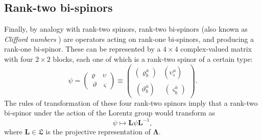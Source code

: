 \documentclass[12pt]{article}
\theoremstyle{definition}
\numberwithin{equation}{section}
\newcommand{\bL}{\mathbf{L}}
\newcommand{\beq}{\begin{equation}}
\newcommand{\eeq}{\end{equation}}
\newcommand{\fL}{\mathfrak{L}}
\newcommand{\bLa}{\boldsymbol{\Lambda}}
\begin{document}
\subsection{Rank-two bi-spinors}
\label{sec:defPWF}
 Finally, by analogy with rank-two spinors, rank-two bi-spinors (also known as {\em Clifford numbers} \cite{Rie1946}) are operators acting on rank-one bi-spinors, and producing a rank-one 
bi-spinor. 
 These can be represented by a $4\times 4$ complex-valued matrix with four $2\times 2$ blocks, each one of which is a rank-two spinor 
of a certain type:
\beq \label{rank2bisp}
\psi = \left( \begin{array}{cc} \varrho & \upsilon \\
\,\vartheta &\, \varsigma \end{array} \right)
\equiv \left( \begin{array}{cc} (\varrho^a_b) & (\upsilon^a_{^{\dot{b}}}) \\
\,(\vartheta^{\dot{a}}_b) &\, (\varsigma^{\dot{a}}_{\dot{b}} )\end{array} \right).
\eeq
 The rules of transformation of these four rank-two spinors imply that a rank-two bi-spinor under the action of the Lorentz group would 
transform as
\beq 
\psi \mapsto \bL \psi \bL^{-1},
\eeq
where $\bL \in \fL$ is the projective representation of $\bLa$.  

\end{document}
